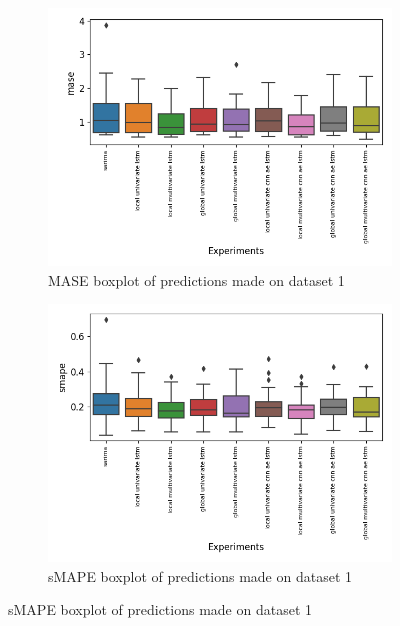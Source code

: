 \begin{figure}[h!]
  \centering
  \label{fig:results:boxplot-dataset-1}
  \caption{Boxplot of predictions made on dataset 1}
  \begin{subfigure}[b]{0.49\textwidth}
    \includegraphics[width=\textwidth]{./figs/results/boxplot/mase-dataset_1.png}
    \hfill
    \caption{MASE boxplot of predictions made on dataset 1}
    \label{fig:results:boxplot-mase-dataset-1-mase}
  \end{subfigure}
  \begin{subfigure}[b]{0.49\textwidth}
    \includegraphics[width=\textwidth]{./figs/results/boxplot/smape-dataset_1.png}
    \hfill
    \caption{sMAPE boxplot of predictions made on dataset 1}
    \label{fig:results:boxplot-mase-dataset-1-smape}

  \end{subfigure}
\end{figure}

